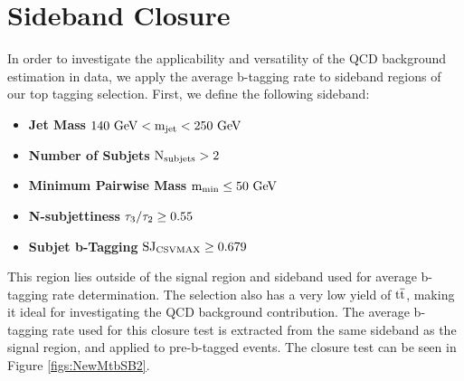 \section{Sideband Closure}
\label{sec:secondsideband}
In order to investigate the applicability and versatility of the QCD background estimation in data, we apply the average b-tagging rate to sideband regions of our top tagging selection.  First, we define the following sideband:

\begin{itemize}
\item {\bf Jet Mass}  $\mathrm{\boldmath 140~\mathrm{GeV} < m_{\text{jet}} < 250~\mathrm{GeV}}$ 
\item {\bf Number of Subjets}  $\mathrm{\boldmath N_{\text{subjets}} > 2}$ 
\item {\bf Minimum Pairwise Mass} $\mathrm{\boldmath m_{\text{min}} \leq 50~\mathrm{GeV}}$ 
\item {\bf N-subjettiness} $\mathrm{\boldmath \tau_3/\tau_2 \geq 0.55}$ 
\item {\bf Subjet b-Tagging} $\mathrm{\boldmath SJ_{\text{CSVMAX}} \geq 0.679}$ 
\end{itemize}
This region lies outside of the signal region and sideband used for average b-tagging rate determination.  
The selection also has a very low yield of $\mathrm{t\overline{t}}$, making it ideal for investigating the QCD background contribution.  
The average b-tagging rate used for this closure test is extracted from the same sideband as the signal region, and applied to pre-b-tagged events.  The closure test can be seen in Figure \ref{figs:NewMtbSB2}.

